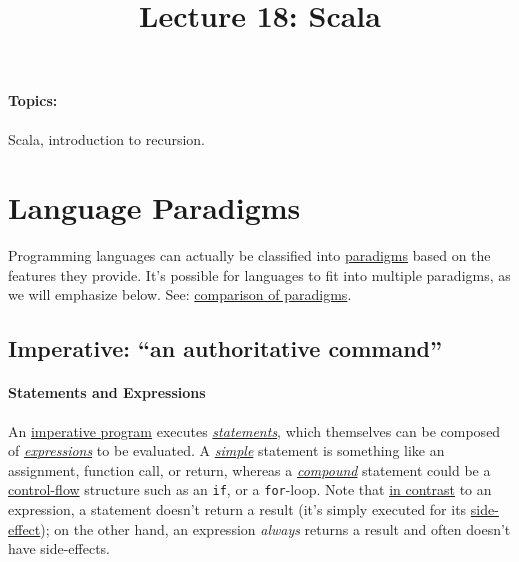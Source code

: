 \documentclass[12pt,letterpaper,twoside]{article}
\begin{document}
\title{Lecture 18: Scala\vspace{-5ex}}
\maketitle

{\footnotesize
\paragraph{Topics:} Scala, introduction to recursion.
}
\vspace{-3ex}

\section{Language Paradigms}
Programming languages can actually be classified into 
\href{https://en.wikipedia.org/wiki/Programming_paradigm}{paradigms} 
based on the features they provide. It's possible for languages to fit into
multiple paradigms, as we will emphasize below. See: 
\href{https://en.wikipedia.org/wiki/Comparison_of_programming_paradigms}
{comparison of paradigms}.

\subsection{Imperative: {\small ``an authoritative command''}}

\paragraph{Statements and Expressions}
An \href{https://en.wikipedia.org/wiki/Imperative_programming}{imperative program} 
executes 
\href{https://en.wikipedia.org/wiki/Statement_(computer_science)}{\emph{statements}},
which themselves can be composed of
\href{https://en.wikipedia.org/wiki/Expression_(computer_science)}{\emph{expressions}}
to be evaluated. A 
\href{https://en.wikipedia.org/wiki/Statement_(computer_science)#Simple_statements}
{\emph{simple}} statement is something like an assignment, function call, or return,
whereas a 
\href{https://en.wikipedia.org/wiki/Statement_(computer_science)#Compound_statements}
{\emph{compound}} statement could be a 
\href{https://en.wikipedia.org/wiki/Control_flow}{control-flow} 
structure such as an \texttt{if},
or a \texttt{for}-loop. Note that \href{https://en.wikipedia.org/wiki/Statement_(computer_science)#Expressions}{in contrast}  to an expression, a statement doesn't return a result
(it's simply executed for its 
\href{https://en.wikipedia.org/wiki/Side_effect_(computer_science)}{side-effect});
on the other hand, an expression \emph{always} returns a result and often doesn't
have side-effects.
\end{document}
